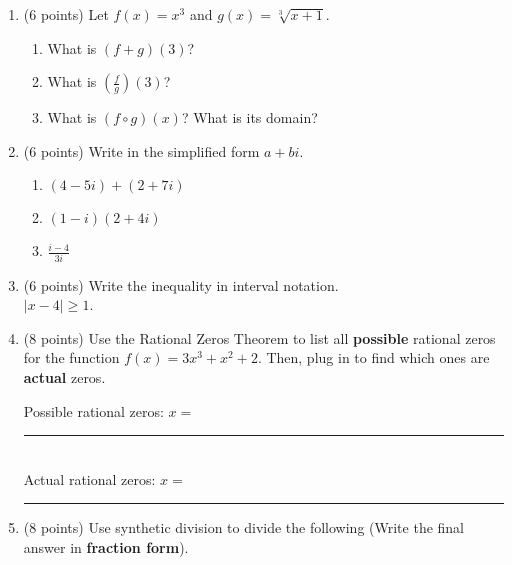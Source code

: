 \documentclass[11pt]{article}
\begin{document}
\begin{enumerate}
\item (6 points) Let $f(x)=x^3$ and $g(x)=\sqrt[3]{x + 1}$.
\begin{enumerate}[itemsep=20pt]
    \item What is $(f+g)(3)$? \\
    \item What is $(\frac{f}{g})(3)$? \\
    \item What is $(f \circ g)(x)$? What is its domain?
\end{enumerate}
\vspace{50pt}

\item (6 points) Write in the simplified form $a + bi$.
\begin{enumerate}[itemsep=20pt]
    \item $(4-5i) + (2+7i)$ \\
    \item $(1-i)(2+4i)$ \\
    \item $\displaystyle{\frac{i-4}{3i}}$ \\
\end{enumerate}
\vspace{10pt}

\item (6 points) Write the inequality in interval notation. \\ 
\hspace{\parindent} $|x-4| \geq 1$.

\newpage

\item (8 points) Use the Rational Zeros Theorem to list all \textbf{possible} rational zeros for the function $f(x) = 3x^3 + x^2 + 2$. Then, plug in to find which ones are \textbf{actual} zeros.

\vspace{20pt}

\begin{flushright}
Possible rational zeros: $x=$ \rule{4cm}{0.4pt} \\
\vspace{20pt}
Actual rational zeros: $x=$ \rule{4cm}{0.4pt}
\end{flushright}

\vspace{20pt}

\item (8 points) Use synthetic division to divide the following (Write the final answer in \textbf{fraction form}).


\end{enumerate}
\end{document}
